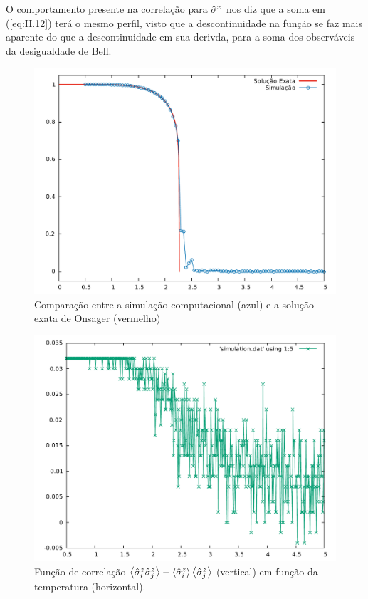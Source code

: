 O comportamento presente na correlação para $\hat{\sigma}^x$ nos diz que a soma em (\ref{eq:II.12}) terá o mesmo perfil, visto que a descontinuidade na função se faz mais aparente do que a descontinuidade em sua derivda, para a soma dos observáveis da desigualdade de Bell. 

\begin{figure}[h]
	\center
	\includegraphics[scale=.3]{ExactMagnet.pdf}
	\caption{Comparação entre a simulação computacional (azul) e a solução exata de Onsager (vermelho)}
	\label{fig:II.4}
\end{figure}

\begin{figure}[h]
	\center
	\includegraphics[scale=.3]{CorrSz.pdf}
	\caption{Função de correlação $\ev{\sz_i \sz_j} - \ev{\sz_i} \ev{\sz_j}$ (vertical) em função da temperatura (horizontal).}
	\label{fig:II.6}
\end{figure}


